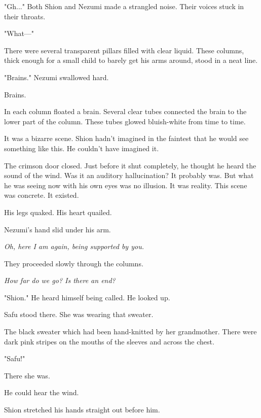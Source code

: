 "Gh..." Both Shion and Nezumi made a strangled noise. Their voices stuck
in their throats.

"What---"

There were several transparent pillars filled with clear liquid. These
columns, thick enough for a small child to barely get his arms around,
stood in a neat line.

"Brains." Nezumi swallowed hard.

Brains.

In each column floated a brain. Several clear tubes connected the brain
to the lower part of the column. These tubes glowed bluish-white from
time to time.

It was a bizarre scene. Shion hadn't imagined in the faintest that he
would see something like this. He couldn't have imagined it.

The crimson door closed. Just before it shut completely, he thought he
heard the sound of the wind. Was it an auditory hallucination? It
probably was. But what he was seeing now with his own eyes was no
illusion. It was reality. This scene was concrete. It existed.

His legs quaked. His heart quailed.

Nezumi's hand slid under his arm.

\emph{Oh, here I am again, being supported by you.}

They proceeded slowly through the columns.

\emph{How far do we go? Is there an end?}

"Shion." He heard himself being called. He looked up.

Safu stood there. She was wearing that sweater.

The black sweater which had been hand-knitted by her grandmother. There
were dark pink stripes on the mouths of the sleeves and across the
chest.

"Safu!"

There she was.

He could hear the wind.

Shion stretched his hands straight out before him.